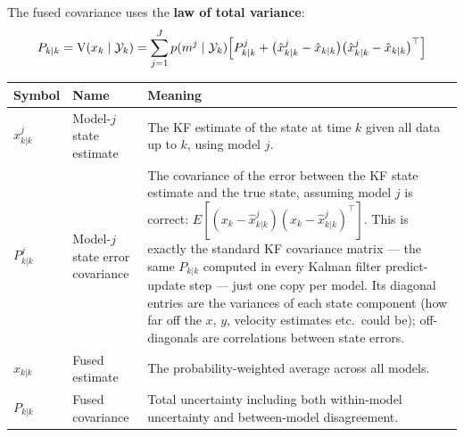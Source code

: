 \documentclass[12pt, a4paper]{article}
\begin{document}
The fused covariance uses the \textbf{law of total variance}:
\[
  P_{k|k}
  = \mathrm{V}(x_k \mid \mathcal{Y}_k)
  = \sum_{j=1}^{J} p(m^j \mid \mathcal{Y}_k)
    \Bigl[
      P_{k|k}^j
      + \bigl(\hat{x}_{k|k}^j - \hat{x}_{k|k}\bigr)
        \bigl(\hat{x}_{k|k}^j - \hat{x}_{k|k}\bigr)^\top
    \Bigr]
\]

\begin{center}
\begin{tabular}{@{} l p{3.2cm} p{7.2cm} @{}}
  \toprule
  Symbol & Name & Meaning \\
  \midrule
  $\hat{x}_{k|k}^j$ & Model-$j$ state estimate &
    The KF estimate of the state at time $k$ given all data up to $k$,
    using model $j$. \\
  $P_{k|k}^j$ & Model-$j$ state error covariance &
    The covariance of the error between the KF state estimate and the
    true state, assuming model $j$ is correct:
    $E[(x_k - \hat{x}_{k|k}^j)(x_k - \hat{x}_{k|k}^j)^\top]$.
    This is exactly the standard KF covariance matrix --- the same
    $P_{k|k}$ computed in every Kalman filter predict-update step ---
    just one copy per model.
    Its diagonal entries are the variances of each state component
    (how far off the $x$, $y$, velocity estimates etc.\ could be);
    off-diagonals are correlations between state errors. \\
  $\hat{x}_{k|k}$ & Fused estimate &
    The probability-weighted average across all models. \\
  $P_{k|k}$ & Fused covariance &
    Total uncertainty including both within-model uncertainty and
    between-model disagreement. \\
  \bottomrule
\end{tabular}
\end{center}
\end{document}

